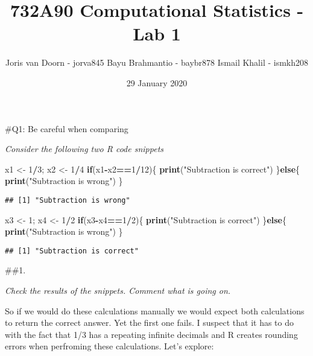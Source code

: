 \documentclass[]{article}
\title{732A90 Computational Statistics - Lab 1}
\author{Joris van Doorn - jorva845 \textbar{} Bayu Brahmantio - baybr878
\textbar{} Ismail Khalil - ismkh208}
\date{29 January 2020}
\newenvironment{Shaded}{\begin{snugshade}}{\end{snugshade}}
\newcommand{\ControlFlowTok}[1]{\textcolor[rgb]{0.13,0.29,0.53}{\textbf{#1}}}
\newcommand{\DecValTok}[1]{\textcolor[rgb]{0.00,0.00,0.81}{#1}}
\newcommand{\KeywordTok}[1]{\textcolor[rgb]{0.13,0.29,0.53}{\textbf{#1}}}
\newcommand{\NormalTok}[1]{#1}
\newcommand{\OperatorTok}[1]{\textcolor[rgb]{0.81,0.36,0.00}{\textbf{#1}}}
\newcommand{\StringTok}[1]{\textcolor[rgb]{0.31,0.60,0.02}{#1}}
\begin{document}
\maketitle

\#Q1: Be careful when comparing

\emph{Consider the following two R code snippets}

\begin{Shaded}
\begin{Highlighting}[]
\NormalTok{x1 <-}\StringTok{ }\DecValTok{1}\OperatorTok{/}\DecValTok{3}\NormalTok{; x2 <-}\StringTok{ }\DecValTok{1}\OperatorTok{/}\DecValTok{4}
\ControlFlowTok{if}\NormalTok{(x1}\OperatorTok{-}\NormalTok{x2}\OperatorTok{==}\DecValTok{1}\OperatorTok{/}\DecValTok{12}\NormalTok{)\{}
  \KeywordTok{print}\NormalTok{(}\StringTok{"Subtraction is correct"}\NormalTok{)}
\NormalTok{\}}\ControlFlowTok{else}\NormalTok{\{}
  \KeywordTok{print}\NormalTok{(}\StringTok{"Subtraction is wrong"}\NormalTok{)}
\NormalTok{\}}
\end{Highlighting}
\end{Shaded}

\begin{verbatim}
## [1] "Subtraction is wrong"
\end{verbatim}

\begin{Shaded}
\begin{Highlighting}[]
\NormalTok{x3 <-}\StringTok{ }\DecValTok{1}\NormalTok{; x4 <-}\StringTok{ }\DecValTok{1}\OperatorTok{/}\DecValTok{2}
\ControlFlowTok{if}\NormalTok{(x3}\OperatorTok{-}\NormalTok{x4}\OperatorTok{==}\DecValTok{1}\OperatorTok{/}\DecValTok{2}\NormalTok{)\{}
  \KeywordTok{print}\NormalTok{(}\StringTok{"Subtraction is correct"}\NormalTok{)}
\NormalTok{\}}\ControlFlowTok{else}\NormalTok{\{}
  \KeywordTok{print}\NormalTok{(}\StringTok{"Subtraction is wrong"}\NormalTok{)}
\NormalTok{\}}
\end{Highlighting}
\end{Shaded}

\begin{verbatim}
## [1] "Subtraction is correct"
\end{verbatim}

\#\#1.

\emph{Check the results of the snippets. Comment what is going on.}

So if we would do these calculations manually we would expect both
calculations to return the correct answer. Yet the first one fails. I
suspect that it has to do with the fact that 1/3 has a repeating
infinite decimals and R creates rounding errors when perfroming these
calculations. Let's explore:
\end{document}
